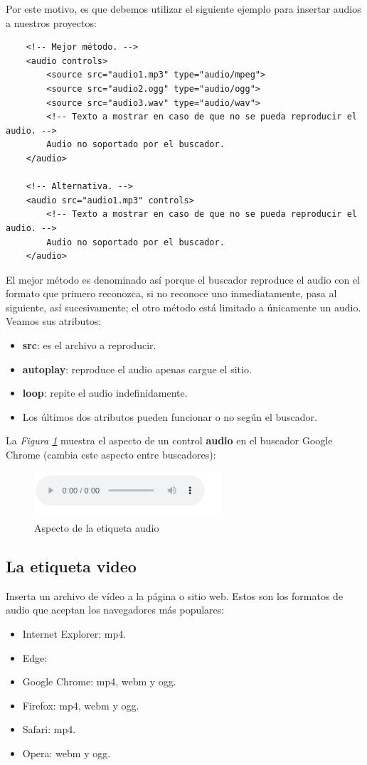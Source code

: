 Por este motivo, es que debemos utilizar el siguiente ejemplo para insertar audios a nuestros proyectos:
\begin{lstlisting}
    <!-- Mejor método. -->
    <audio controls>
        <source src="audio1.mp3" type="audio/mpeg">
        <source src="audio2.ogg" type="audio/ogg">
        <source src="audio3.wav" type="audio/wav">
        <!-- Texto a mostrar en caso de que no se pueda reproducir el audio. -->
        Audio no soportado por el buscador.
    </audio>

    <!-- Alternativa. -->
    <audio src="audio1.mp3" controls>
        <!-- Texto a mostrar en caso de que no se pueda reproducir el audio. -->
        Audio no soportado por el buscador.
    </audio>
\end{lstlisting}

El mejor método es denominado así porque el buscador reproduce el audio con el formato que primero reconozca, si no reconoce uno inmediatamente, pasa al siguiente, así sucesivamente; el otro método está limitado a únicamente un audio. Veamos sus atributos:
\begin{itemize}
    \item \textbf{src}: es el archivo a reproducir.
    \item \textbf{autoplay}: reproduce el audio apenas cargue el sitio.
    \item \textbf{loop}: repite el audio indefinidamente.
    \item Los últimos dos atributos pueden funcionar o no según el buscador.
\end{itemize}

La \textit{Figura \ref{fig: 15}} muestra el aspecto de un control \textbf{audio} en el buscador Google Chrome (cambia este aspecto entre buscadores):
\begin{figure}[H]
    \centering
    \caption{Aspecto de la etiqueta audio}
    \label{fig: 15}
    \includegraphics[width=7cm]{ss_html/audio.png}
\end{figure}


\subsection{La etiqueta video}

Inserta un archivo de vídeo a la página o sitio web. Estos son los formatos de audio que aceptan los navegadores más populares:
\begin{itemize}
    \item Internet Explorer: mp4.
    \item Edge: 
    \item Google Chrome: mp4, webm y ogg.
    \item Firefox: mp4, webm y ogg.
    \item Safari: mp4.
    \item Opera: webm y ogg.
\end{itemize}


